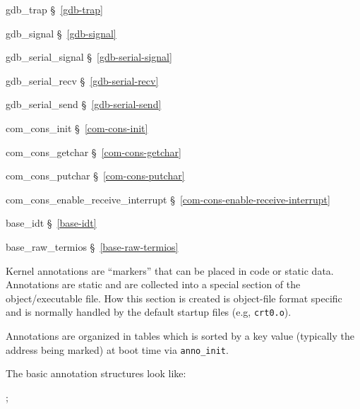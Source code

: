 \begin{apidep}
	\item[gdb_trap]			\S~\ref{gdb-trap}
	\item[gdb_signal]		\S~\ref{gdb-signal}
	\item[gdb_serial_signal]	\S~\ref{gdb-serial-signal}
	\item[gdb_serial_recv]		\S~\ref{gdb-serial-recv}
	\item[gdb_serial_send]		\S~\ref{gdb-serial-send}
	\item[com_cons_init]		\S~\ref{com-cons-init}
	\item[com_cons_getchar]		\S~\ref{com-cons-getchar}
	\item[com_cons_putchar]		\S~\ref{com-cons-putchar}
	\item[com_cons_enable_receive_interrupt]
					\S~\ref{com-cons-enable-receive-interrupt}
	\item[base_idt]			\S~\ref{base-idt}
	\item[base_raw_termios]		\S~\ref{base-raw-termios}
\end{apidep}



\label{kern-anno}

Kernel annotations are ``markers'' that can be placed in code or static data.
Annotations are static and are collected into a special section
of the object/executable file.
How this section is created is object-file format specific and is
normally handled by the default startup files (e.g, {\tt crt0.o}).

Annotations are organized in tables which is sorted by a key value
(typically the address being marked) at boot time via {\tt anno_init}.

The basic annotation structures look like:

;

